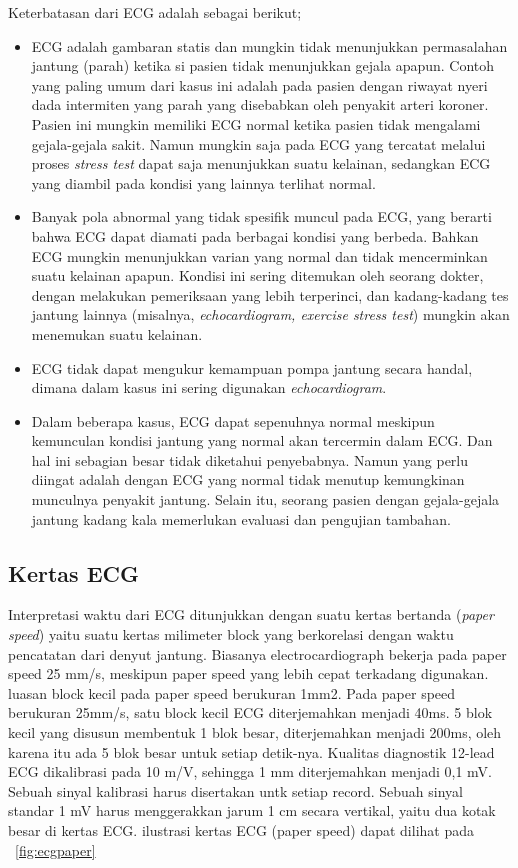 \noindent
Keterbatasan dari ECG adalah sebagai berikut;
\begin{itemize}
    \item ECG adalah gambaran statis dan mungkin  tidak menunjukkan permasalahan
    jantung (parah) ketika si pasien tidak menunjukkan gejala apapun. Contoh
    yang paling umum dari kasus ini adalah pada pasien dengan riwayat nyeri dada
    intermiten yang parah yang disebabkan oleh penyakit arteri koroner. Pasien
    ini mungkin memiliki ECG normal ketika pasien tidak mengalami gejala-gejala
    sakit. Namun mungkin saja pada ECG yang tercatat melalui proses
    \textit{stress test} dapat saja menunjukkan suatu kelainan, sedangkan ECG
    yang diambil pada kondisi yang lainnya terlihat normal.

	\item Banyak pola  abnormal yang tidak spesifik muncul pada ECG,  yang berarti
	bahwa ECG dapat diamati pada berbagai kondisi yang berbeda. Bahkan ECG mungkin
	menunjukkan varian yang normal dan tidak mencerminkan suatu kelainan apapun.
	Kondisi ini sering ditemukan oleh seorang dokter, dengan melakukan pemeriksaan
	yang lebih terperinci, dan kadang-kadang tes jantung lainnya (misalnya,
	\textit{echocardiogram, exercise stress test}) mungkin akan menemukan suatu
	kelainan.

	\item ECG tidak dapat mengukur kemampuan pompa jantung secara handal, dimana
	dalam kasus ini sering digunakan \textit{echocardiogram}.

	\item Dalam beberapa kasus, ECG dapat sepenuhnya normal meskipun kemunculan
	kondisi jantung yang normal akan tercermin dalam ECG. Dan hal ini sebagian besar
	tidak diketahui penyebabnya. Namun yang perlu diingat adalah dengan ECG yang
	normal tidak menutup kemungkinan munculnya penyakit jantung. Selain itu, seorang
	pasien dengan gejala-gejala jantung kadang kala memerlukan evaluasi dan
	pengujian tambahan.

\end{itemize}

\subsection{Kertas ECG} 
Interpretasi waktu dari ECG ditunjukkan dengan suatu kertas bertanda
(\textit{paper speed}) yaitu suatu  kertas milimeter block yang berkorelasi
dengan waktu pencatatan dari denyut jantung. Biasanya electrocardiograph bekerja
pada paper speed 25 mm/s, meskipun paper speed yang lebih cepat terkadang
digunakan. luasan block kecil pada paper speed berukuran 1mm2. Pada paper speed
berukuran 25mm/s, satu block kecil ECG diterjemahkan menjadi 40ms. 5 blok kecil
yang disusun membentuk 1 blok besar, diterjemahkan menjadi 200ms, oleh karena
itu ada 5 blok besar untuk setiap detik-nya. Kualitas diagnostik 12-lead ECG
dikalibrasi pada 10 m/V, sehingga 1 mm diterjemahkan menjadi 0,1 mV. Sebuah
sinyal kalibrasi harus disertakan untk setiap record. Sebuah sinyal standar 1 mV
harus menggerakkan jarum 1 cm secara vertikal, yaitu dua kotak besar di kertas
ECG. ilustrasi kertas ECG (paper speed) dapat dilihat pada
\pic~\ref{fig:ecgpaper}

